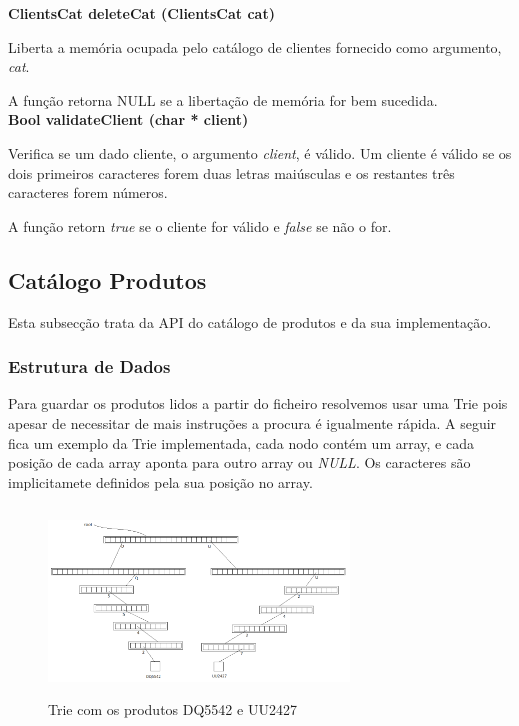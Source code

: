 \documentclass[10pt] {article}
\begin{document}
\noindent \textbf{ClientsCat deleteCat (ClientsCat cat)}
\par Liberta a memória ocupada pelo catálogo de clientes fornecido como argumento, \emph{cat}.
\par A função retorna NULL se a libertação de memória for bem sucedida. \\

\noindent \textbf{Bool validateClient (char * client)}
\par Verifica se um dado cliente, o argumento \emph{client}, é válido. Um cliente é válido se os dois primeiros
caracteres forem duas letras maiúsculas e os restantes três caracteres forem números.
\par A função retorn \emph{true} se o cliente for válido e \emph{false} se não o for.



\subsection{Catálogo Produtos}
\par Esta subsecção trata da API do catálogo de produtos e da sua implementação.

\subsubsection{Estrutura de Dados}
\par
Para guardar os produtos lidos a partir do ficheiro resolvemos usar uma Trie pois apesar de
necessitar de mais instruções a procura é igualmente rápida. A seguir fica um exemplo da Trie implementada, 
cada nodo contém um array, e cada posição de cada array aponta para outro array ou \emph{NULL}. Os caracteres
são implicitamete definidos pela sua posição no array.


\begin{figure}[ht!]
\centering
\includegraphics[width=80mm, height=50mm]{trie2.png}
\caption{Trie com os produtos DQ5542 e UU2427}
\end{figure}
\end{document}
